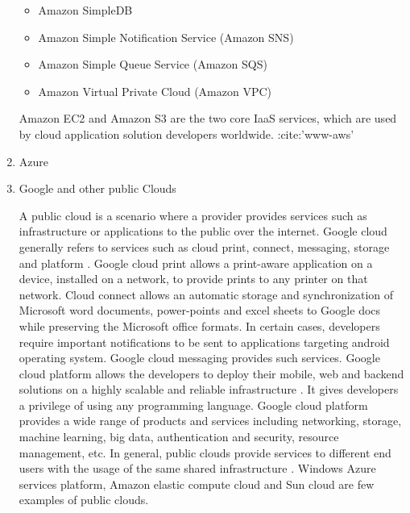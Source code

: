 \begin{enumerate}
\begin{itemize}
\item {} 
Amazon SimpleDB

\item {} 
Amazon Simple Notification Service (Amazon SNS)

\item {} 
Amazon Simple Queue Service (Amazon SQS)

\item {} 
Amazon Virtual Private Cloud (Amazon VPC)

\end{itemize}

Amazon EC2 and Amazon S3 are the two core IaaS services, which
are used by cloud application solution developers
worldwide. :cite:'www-aws'


\item {} 
Azure

\item {} 
Google and other public Clouds

A public cloud is a scenario where a provider provides services
such as infrastructure or applications to the public over the
internet. Google cloud generally refers to services such as cloud
print, connect, messaging, storage and platform
\label{\detokenize{i524/technologies:id654}}{\hyperref[\detokenize{i524/technologies:goo1}]{\sphinxcrossref{{[}567{]}}}}. Google cloud print allows a print-aware application
on a device, installed on a network, to provide prints to any
printer on that network. Cloud connect allows an automatic
storage and synchronization of Microsoft word documents,
power-points and excel sheets to Google docs while preserving the
Microsoft office formats. In certain cases, developers require
important notifications to be sent to applications targeting
android operating system. Google cloud messaging provides such
services. Google cloud platform allows the developers to deploy
their mobile, web and backend solutions on a highly scalable and
reliable infrastructure \label{\detokenize{i524/technologies:id655}}{\hyperref[\detokenize{i524/technologies:goo2}]{\sphinxcrossref{{[}568{]}}}}. It gives developers a
privilege of using any programming language. Google cloud
platform provides a wide range of products and services including
networking, storage, machine learning, big data, authentication
and security, resource management, etc. In general, public clouds
provide services to different end users with the usage of the
same shared infrastructure \label{\detokenize{i524/technologies:id656}}{\hyperref[\detokenize{i524/technologies:goo3}]{\sphinxcrossref{{[}569{]}}}}. Windows Azure services
platform, Amazon elastic compute cloud and Sun cloud are few
examples of public clouds.


\end{enumerate}
